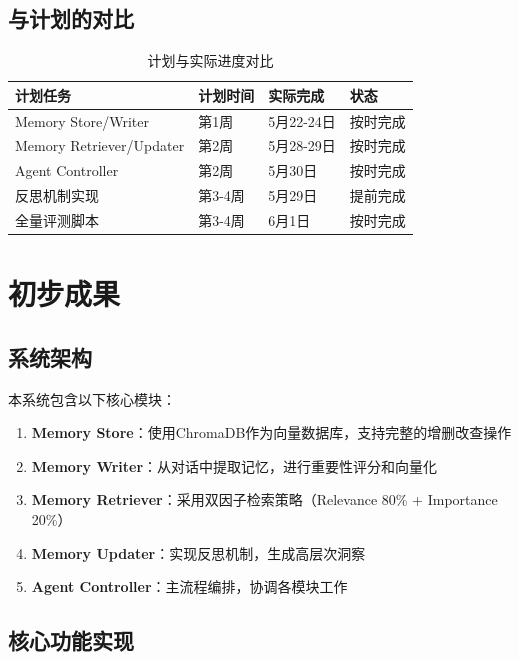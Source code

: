 \documentclass[11pt]{article}
\begin{document}
\subsection{与计划的对比}

\begin{table}[H]
    \centering
    \begin{tabular}{|l|l|l|l|}
        \hline
        计划任务 & 计划时间 & 实际完成 & 状态 \\
        \hline
        Memory Store/Writer & 第1周 & 5月22-24日 & 按时完成 \\
        \hline
        Memory Retriever/Updater & 第2周 & 5月28-29日 & 按时完成 \\
        \hline
        Agent Controller & 第2周 & 5月30日 & 按时完成 \\
        \hline
        反思机制实现 & 第3-4周 & 5月29日 & 提前完成 \\
        \hline
        全量评测脚本 & 第3-4周 & 6月1日 & 按时完成 \\
        \hline
    \end{tabular}
    \caption{计划与实际进度对比}
\end{table}

\section{初步成果}

\subsection{系统架构}

本系统包含以下核心模块：

\begin{enumerate}
    \item \textbf{Memory Store}：使用ChromaDB作为向量数据库，支持完整的增删改查操作
    \item \textbf{Memory Writer}：从对话中提取记忆，进行重要性评分和向量化
    \item \textbf{Memory Retriever}：采用双因子检索策略（Relevance 80\% + Importance 20\%）
    \item \textbf{Memory Updater}：实现反思机制，生成高层次洞察
    \item \textbf{Agent Controller}：主流程编排，协调各模块工作
\end{enumerate}

\subsection{核心功能实现}
\end{document}
